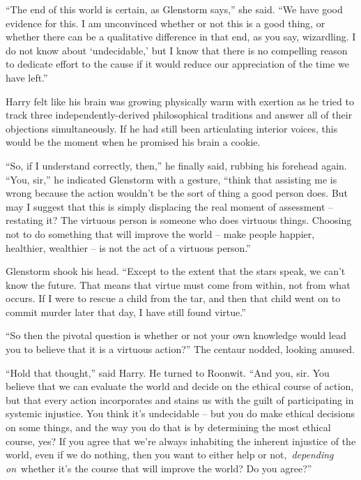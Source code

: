``The end of this world is certain, as Glenstorm says,'' she said. ``We
have good evidence for this. I am unconvinced whether or not this is a
good thing, or whether there can be a qualitative difference in that
end, as you say, wizardling. I do not know about `undecidable,' but I
know that there is no compelling reason to dedicate effort to the cause
if it would reduce our appreciation of the time we have left.''

Harry felt like his brain was growing physically warm with exertion as
he tried to track three independently-derived philosophical traditions
and answer all of their objections simultaneously. If he had still been
articulating interior voices, this would be the moment when he promised
his brain a cookie.

``So, if I understand correctly, then,'' he finally said, rubbing his
forehead again. ``You, sir,'' he indicated Glenstorm with a gesture,
``think that assisting me is wrong because the action wouldn't be the
sort of thing a good person does. But may I suggest that this is simply
displacing the real moment of assessment -- restating it? The virtuous
person is someone who does virtuous things. Choosing not to do something
that will improve the world -- make people happier, healthier, wealthier
-- is not the act of a virtuous person.''

Glenstorm shook his head. ``Except to the extent that the stars speak,
we can't know the future. That means that virtue must come from within,
not from what occurs. If I were to rescue a child from the tar, and then
that child went on to commit murder later that day, I have still found
virtue.''

``So then the pivotal question is whether or not your own knowledge
would lead you to believe that it is a virtuous action?'' The centaur
nodded, looking amused.

``Hold that thought,'' said Harry. He turned to Roonwit. ``And you, sir.
You believe that we can evaluate the world and decide on the ethical
course of action, but that every action incorporates and stains us with
the guilt of participating in systemic injustice. You think it's
undecidable -- but you do make ethical decisions on some things, and the
way you do that is by determining the most ethical course, yes? If you
agree that we're always inhabiting the inherent injustice of the world,
even if we do nothing, then you want to either help or
not,~\emph{depending on}~whether it's the course that will improve the
world? Do you agree?''


